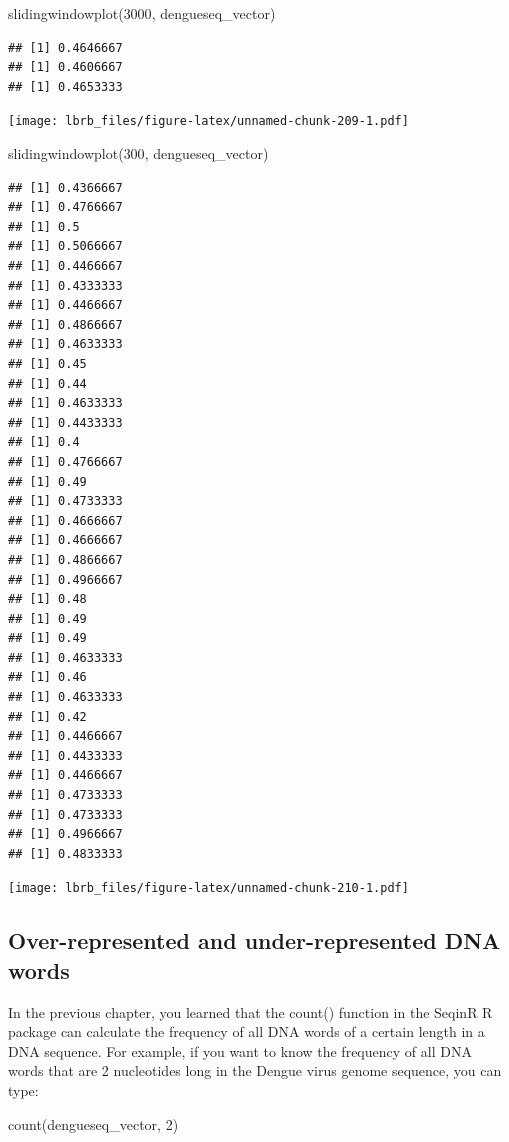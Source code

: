 \documentclass[
]{book}
\newenvironment{Shaded}{\begin{snugshade}}{\end{snugshade}}
\newcommand{\DecValTok}[1]{\textcolor[rgb]{0.00,0.00,0.81}{#1}}
\newcommand{\FunctionTok}[1]{\textcolor[rgb]{0.00,0.00,0.00}{#1}}
\newcommand{\NormalTok}[1]{#1}
\begin{document}
\begin{Shaded}
\begin{Highlighting}[]
 \FunctionTok{slidingwindowplot}\NormalTok{(}\DecValTok{3000}\NormalTok{, dengueseq\_vector)}
\end{Highlighting}
\end{Shaded}

\begin{verbatim}
## [1] 0.4646667
## [1] 0.4606667
## [1] 0.4653333
\end{verbatim}

\texttt{[image: lbrb\_files/figure-latex/unnamed-chunk-209-1.pdf]}

\begin{Shaded}
\begin{Highlighting}[]
 \FunctionTok{slidingwindowplot}\NormalTok{(}\DecValTok{300}\NormalTok{, dengueseq\_vector)}
\end{Highlighting}
\end{Shaded}

\begin{verbatim}
## [1] 0.4366667
## [1] 0.4766667
## [1] 0.5
## [1] 0.5066667
## [1] 0.4466667
## [1] 0.4333333
## [1] 0.4466667
## [1] 0.4866667
## [1] 0.4633333
## [1] 0.45
## [1] 0.44
## [1] 0.4633333
## [1] 0.4433333
## [1] 0.4
## [1] 0.4766667
## [1] 0.49
## [1] 0.4733333
## [1] 0.4666667
## [1] 0.4666667
## [1] 0.4866667
## [1] 0.4966667
## [1] 0.48
## [1] 0.49
## [1] 0.49
## [1] 0.4633333
## [1] 0.46
## [1] 0.4633333
## [1] 0.42
## [1] 0.4466667
## [1] 0.4433333
## [1] 0.4466667
## [1] 0.4733333
## [1] 0.4733333
## [1] 0.4966667
## [1] 0.4833333
\end{verbatim}

\texttt{[image: lbrb\_files/figure-latex/unnamed-chunk-210-1.pdf]}

\hypertarget{over-represented-and-under-represented-dna-words}{%
\subsection{Over-represented and under-represented DNA words}\label{over-represented-and-under-represented-dna-words}}

In the previous chapter, you learned that the count() function in the SeqinR R package can calculate the frequency of all DNA words of a certain length in a DNA sequence. For example, if you want to know the frequency of all DNA words that are 2 nucleotides long in the Dengue virus genome sequence, you can type:

\begin{Shaded}
\begin{Highlighting}[]
 \FunctionTok{count}\NormalTok{(dengueseq\_vector, }\DecValTok{2}\NormalTok{)}
\end{Highlighting}
\end{Shaded}
\end{document}
